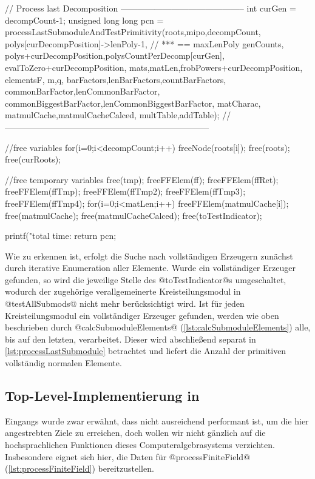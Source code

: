\begin{ccode}[caption={Aus \url{../Sage/enumeratePCNs.c}},
  firstnumber=1173, label=lst:processFiniteField]
{    // Process last Decomposition --------------------------------------------
    int curGen = decompCount-1;
    unsigned long long pcn = 
        processLastSubmoduleAndTestPrimitivity(roots,mipo,decompCount,
            polys[curDecompPosition]->lenPoly-1, // *** == maxLenPoly
            genCounts,
            polys+curDecompPosition,polysCountPerDecomp[curGen],
            evalToZero+curDecompPosition,
            mats,matLen,frobPowers+curDecompPosition,
            elementsF,
            m,q,
            barFactors,lenBarFactors,countBarFactors,
            commonBarFactor,lenCommonBarFactor,
            commonBiggestBarFactor,lenCommonBiggestBarFactor,
            matCharac,
            matmulCache,matmulCacheCalced,
            multTable,addTable);
    //------------------------------------------------------------------------

    //free variables
    for(i=0;i<decompCount;i++)
        freeNode(roots[i]);
    free(roots); free(curRoots);

    //free temporary variables
    free(tmp);
    freeFFElem(ff);
    freeFFElem(ffRet);
    freeFFElem(ffTmp);
    freeFFElem(ffTmp2);
    freeFFElem(ffTmp3);
    freeFFElem(ffTmp4);
    for(i=0;i<matLen;i++) freeFFElem(matmulCache[i]);
    free(matmulCache);
    free(matmulCacheCalced);
    free(toTestIndicator);

    
    printf("total time: %
    return pcn;
}
\end{ccode}

Wie zu erkennen ist, erfolgt die Suche nach vollständigen Erzeugern zunächst
durch iterative Enumeration aller Elemente. Wurde ein vollständiger Erzeuger
gefunden, so wird die jeweilige Stelle des @toTestIndicator@s umgeschaltet,
wodurch der zugehörige verallgemeinerte Kreisteilungsmodul in 
@testAllSubmods@ nicht mehr berücksichtigt wird. Ist für jeden
Kreisteilungsmodul ein vollständiger Erzeuger gefunden, werden wie oben
beschrieben durch @calcSubmoduleElements@ (\autoref{lst:calcSubmoduleElements})
alle, bis auf den letzten, verarbeitet. Dieser wird abschließend separat in
\autoref{lst:processLastSubmodule}
betrachtet und liefert die Anzahl der primitiven vollständig normalen Elemente.


\subsection{Top-Level-Implementierung in \sage}

Eingangs wurde zwar erwähnt, dass \sage nicht ausreichend performant ist, um
die hier angestrebten Ziele zu erreichen, doch wollen wir nicht gänzlich auf
die hochsprachlichen Funktionen dieses Computeralgebrasystems verzichten.
Insbesondere eignet sich \sage hier, die Daten für
@processFiniteField@ (\autoref{lst:processFiniteField}) bereitzustellen.


